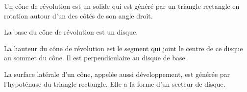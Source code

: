 \documentclass[a4paper,10pt]{report}
\begin{document}
\vspace{-8mm}
\noindent \begin{minipage}{12cm}
\begin{defn}
Un cône de révolution est un solide qui est généré par un triangle rectangle en rotation autour d'un des côtés de son angle droit.
\end{defn}

\begin{defn}
La base du cône de révolution est un disque.
\end{defn}

\begin{defn}
La hauteur du cône de révolution est le segment qui joint le centre de ce disque au sommet du cône. Il est perpendiculaire au disque de base.
\end{defn}
\end{minipage}
\hspace{5mm}
\begin{minipage}{4cm}
\vspace{5mm}
\begin{center}
\end{center}
\end{minipage}

\begin{rem}
La surface latérale d'un cône, appelée aussi développement, est générée par l'hypoténuse du triangle rectangle. Elle a la forme d'un secteur de disque.
\end{rem}
\end{document}
